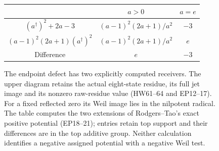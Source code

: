\documentclass[11pt,a4paper]{article}
\theoremstyle{definition}\newtheorem{definition}[theorem]{Definition}
\begin{document}
\begin{figure}[p]
\centering
{}
\medskip
\begin{tabular}{c|c|c}
 & $a>0$ & $a=e$\\\hline
 $(a^\dagger)^2+2a-3$ & $(a-1)^2(2a+1)/a^2$ & $-3$\\[3pt]
 $(a-1)^2(2a+1)(a^\dagger)^2$ & $(a-1)^2(2a+1)/a^2$ & $e$\\[3pt]
 Difference & $e$ & $-3$
\end{tabular}
\caption{The endpoint defect has two explicitly computed receivers.
The upper diagram retains the actual eight-state residue, its full
jet image and its nonzero raw-residue value (HW61--64 and EP12--17).
For a fixed reflected zero its Weil image lies in the nilpotent radical.
The table computes the two extensions of Rodgers--Tao's exact
positive potential (EP18--21); entries retain top support and their
differences are in the top additive group. Neither calculation
identifies a negative assigned potential with a negative Weil test.}
\end{figure}
\end{document}
